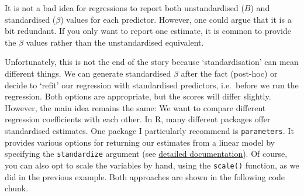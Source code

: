 \documentclass[
]{book}
\begin{document}
It is not a bad idea for regressions to report both unstandardised (\(B\)) and standardised (\(\beta\)) values for each predictor. However, one could argue that it is a bit redundant. If you only want to report one estimate, it is common to provide the \(\beta\) values rather than the unstandardised equivalent.

Unfortunately, this is not the end of the story because `standardisation' can mean different things. We can generate standardised \(\beta\) after the fact (post-hoc) or decide to `refit' our regression with standardised predictors, i.e.~before we run the regression. Both options are appropriate, but the scores will differ slightly. However, the main idea remains the same: We want to compare different regression coefficients with each other. In R, many different packages offer standardised estimates. One package I particularly recommend is \texttt{parameters}. It provides various options for returning our estimates from a linear model by specifying the \texttt{standardize} argument (see \href{https://easystats.github.io/parameters/reference/model_parameters.default.html}{detailed documentation}). Of course, you can also opt to scale the variables by hand, using the \texttt{scale()} function, as we did in the previous example. Both approaches are shown in the following code chunk.
\end{document}
